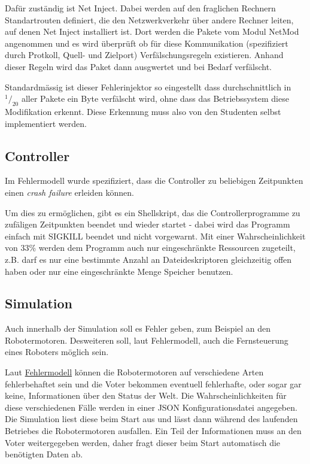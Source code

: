 Daf{\"{u}}r zust{\"{a}}ndig ist Net Inject\cite{kubertzki}. Dabei werden auf den fraglichen Rechnern
Standartrouten definiert, die den Netzwerkverkehr {\"{u}}ber andere Rechner leiten, auf denen Net Inject
installiert ist. Dort werden die Pakete vom Modul NetMod angenommen und es wird {\"{u}}berpr{\"{u}}ft ob
f{\"{u}}r diese Kommunikation (spezifiziert durch Protkoll, Quell- und Zielport) Verf{\"{a}}lschungsregeln
existieren. Anhand dieser Regeln wird das Paket dann ausgwertet und bei Bedarf verf{\"{a}}lscht.

Standardm{\"{a}}ssig ist dieser Fehlerinjektor so eingestellt dass durchschnittlich in $ ^1/_{20} $ aller Pakete ein Byte verf{\"{a}}lscht wird,
ohne dass das Betriebssystem diese Modifikation erkennt. Diese Erkennung muss also von den Studenten selbst implementiert werden.

\subsection{Controller}
Im Fehlermodell wurde spezifiziert, dass die Controller zu beliebigen Zeitpunkten einen
\textit{crash failure} erleiden k{\"{o}}nnen.

Um dies zu erm{\"{o}}glichen, gibt es ein Shellskript, das die Controllerprogramme zu zuf{\"{a}}ligen Zeitpunkten 
beendet und wieder startet - dabei wird das Programm einfach mit SIGKILL beendet und nicht vorgewarnt.
Mit einer Wahrscheinlichkeit von 33\% werden dem Programm auch nur eingeschr{\"{a}}nkte Ressourcen zugeteilt,
z.B. darf es nur eine bestimmte Anzahl an Dateideskriptoren gleichzeitig offen haben oder nur eine 
eingeschr{\"{a}}nkte Menge Speicher benutzen.


\subsection{Simulation}
Auch innerhalb der Simulation soll es Fehler geben, zum Beispiel an den Robotermotoren. Desweiteren soll,
laut Fehlermodell, auch die Fernsteuerung eines Roboters m{\"{o}}glich sein.

Laut \hyperref[fm]{Fehlermodell} k{\"{o}}nnen die Robotermotoren auf verschiedene Arten fehlerbehaftet
sein und die Voter bekommen eventuell fehlerhafte, oder sogar gar keine, Informationen {\"{u}}ber
den Status der Welt. Die Wahrscheinlichkeiten f{\"{u}}r diese verschiedenen F{\"{a}}lle
werden in einer JSON Konfigurationsdatei angegeben. Die Simulation liest diese beim Start aus und 
l{\"{a}}sst dann w{\"{a}}hrend des laufenden Betriebes die Robotermotoren ausfallen.
Ein Teil der Informationen muss an den Voter weitergegeben werden, daher fragt dieser beim Start
automatisch die ben{\"{o}}tigten Daten ab.


